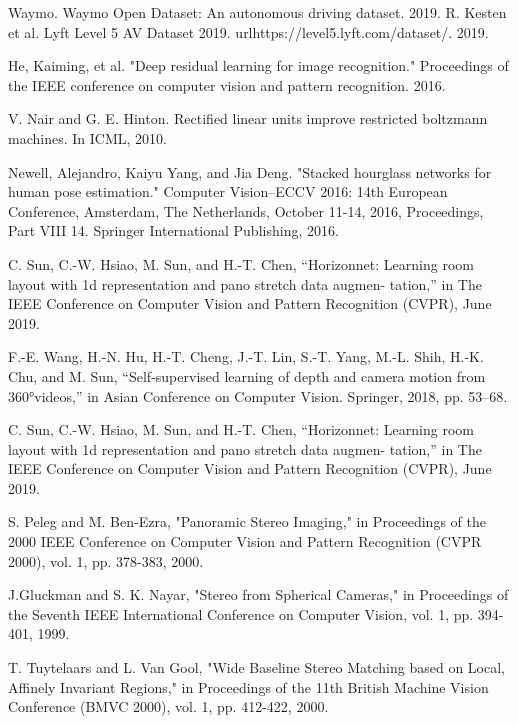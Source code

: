 \documentclass[english, LaM, oneside]{sapthesis}%
\begin{document}
\begin{thebibliography}{99}
 Waymo. Waymo Open Dataset: An autonomous driving dataset. 2019.
 R. Kesten et al. Lyft Level 5 AV Dataset 2019. url{https://level5.lyft.com/dataset/. 2019}.

He, Kaiming, et al. "Deep residual learning for image recognition." Proceedings of the IEEE conference on computer vision and pattern recognition. 2016.

 V. Nair and G. E. Hinton. Rectified linear units improve restricted boltzmann machines. In ICML, 2010.

 Newell, Alejandro, Kaiyu Yang, and Jia Deng. "Stacked hourglass networks for human pose estimation." Computer Vision–ECCV 2016: 14th European Conference, Amsterdam, The Netherlands, October 11-14, 2016, Proceedings, Part VIII 14. Springer International Publishing, 2016.

 C. Sun, C.-W. Hsiao, M. Sun, and H.-T. Chen, “Horizonnet: Learning room layout with 1d representation and pano stretch data augmen- tation,” in The IEEE Conference on Computer Vision and Pattern Recognition (CVPR), June 2019.

 F.-E. Wang, H.-N. Hu, H.-T. Cheng, J.-T. Lin, S.-T. Yang, M.-L. Shih, H.-K. Chu, and M. Sun, “Self-supervised learning of depth and camera motion from 360°videos,” in Asian Conference on Computer Vision. Springer, 2018, pp. 53–68.

 C. Sun, C.-W. Hsiao, M. Sun, and H.-T. Chen, “Horizonnet: Learning room layout with 1d representation and pano stretch data augmen- tation,” in The IEEE Conference on Computer Vision and Pattern Recognition (CVPR), June 2019.

 S. Peleg and M. Ben-Ezra, "Panoramic Stereo Imaging," in Proceedings of the 2000 IEEE Conference on Computer Vision and Pattern Recognition (CVPR 2000), vol. 1, pp. 378-383, 2000.

 J.Gluckman and S. K. Nayar, "Stereo from Spherical Cameras," in Proceedings of the Seventh IEEE International Conference on Computer Vision, vol. 1, pp. 394-401, 1999.

 T. Tuytelaars and L. Van Gool, "Wide Baseline Stereo Matching based on Local, Affinely Invariant Regions," in Proceedings of the 11th British Machine Vision Conference (BMVC 2000), vol. 1, pp. 412-422, 2000.















\end{thebibliography}
\end{document}
